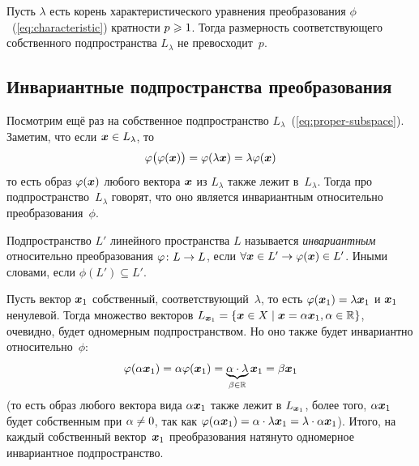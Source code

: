 \documentclass[a4paper,12pt]{article}
\begin{document}
  \begin{proposition}
    Пусть $\lambda$ есть корень характеристического уравнения преобразования $\phi$~(\ref{eq:characteristic}) кратности $p \hm\geq 1$.
    Тогда размерность соответствующего собственного подпространства $L_{\lambda}$ не превосходит~$p$.
  \end{proposition}
  
  
  \subsection{Инвариантные подпространства преобразования}
  
  Посмотрим ещё раз на собственное подпространство $L_{\lambda}$~(\ref{eq:proper-subspace}).
  Заметим, что если $\bds x \hm\in L_{\lambda}$, то
  \[
    \varphi\bigl(\varphi(\boldsymbol x)\bigr) = \varphi(\lambda \boldsymbol x) = \lambda \varphi(\boldsymbol x)
  \]
  то есть образ $\varphi(\boldsymbol x)$ любого вектора $\boldsymbol x$ из $L_{\lambda}$ также лежит в~$L_{\lambda}$.
  Тогда про подпространство~$L_{\lambda}$ говорят, что оно является инвариантным относительно преобразования~$\phi$.
  
  \begin{definition}
    Подпространство $L'$ линейного пространства $L$ называется \emph{инвариантным} относительно преобразования $\phi\colon L \hm\to L$, если $\forall \bds x \hm\in L' \hm\to \phi(\bds x) \hm\in L'$.  %
    Иными словами, если $\phi(L') \subseteq L'$.
  \end{definition}
  
  Пусть вектор $\boldsymbol x_1$ собственный, соответствующий~$\lambda$, то есть $\phi(\bds x_1) \hm= \lambda \bds x_1$ и $\boldsymbol x_1$ ненулевой.
  Тогда множество векторов $L_{\bds x_1} \hm= \{\bds x \hm\in X \hm\mid \bds x \hm= \alpha \bds x_1, \alpha \hm\in \RR\}$, очевидно, будет одномерным подпространством.
  Но оно также будет инвариантно относительно~$\phi$:
  \[
    \phi(\alpha \bds x_1) \hm= \alpha \phi(\bds x_1) = \underbrace{\alpha \cdot \lambda}_{\beta \in \RR} \bds x_1 = \beta \bds x_1
  \]
  (то есть образ любого вектора вида $\alpha \boldsymbol x_1$ также лежит в $L_{\boldsymbol x_1}$, более того, $\alpha \boldsymbol x_1$ будет собственным при $\alpha \hm{\not=} 0$, так как $\phi(\alpha \bds x_1) \hm= \alpha \cdot \lambda \bds x_1 \hm= \lambda \cdot \alpha \bds x_1$).
  Итого, на каждый собственный вектор~$\boldsymbol x_1$ преобразования натянуто одномерное инвариантное подпространство.
  
  
\end{document}
